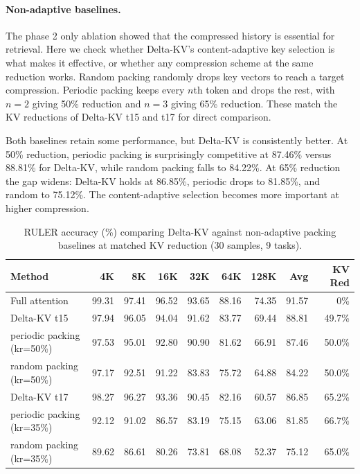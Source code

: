 \paragraph{Non-adaptive baselines.}

The phase 2 only ablation showed that the compressed history is essential for retrieval. Here we check whether Delta-KV's content-adaptive key selection is what makes it effective, or whether any compression scheme at the same reduction works. Random packing randomly drops key vectors to reach a target compression. Periodic packing keeps every $n$th token and drops the rest, with $n=2$ giving 50\% reduction and $n=3$ giving 65\% reduction. These match the KV reductions of Delta-KV t15 and t17 for direct comparison.

Both baselines retain some performance, but Delta-KV is consistently better. At 50\% reduction, periodic packing is surprisingly competitive at 87.46\% versus 88.81\% for Delta-KV, while random packing falls to 84.22\%. At 65\% reduction the gap widens: Delta-KV holds at 86.85\%, periodic drops to 81.85\%, and random to 75.12\%. The content-adaptive selection becomes more important at higher compression.

\begin{table}[!ht]
\centering
\caption{RULER accuracy (\%) comparing Delta-KV against non-adaptive packing baselines at matched KV reduction (30 samples, 9 tasks).}
\label{tab:ablation_packing}
\begin{tabular}{lrrrrrrrr}
\toprule
Method & 4K & 8K & 16K & 32K & 64K & 128K & Avg & KV Red \\
\midrule
Full attention              & 99.31 & 97.41 & 96.52 & 93.65 & 88.16 & 74.35 & 91.57 & 0\%    \\
\midrule
Delta-KV t15          & 97.94 & 96.05 & 94.04 & 91.62 & 83.77 & 69.44 & 88.81 & 49.7\% \\
periodic packing (kr=50\%)  & 97.53 & 95.01 & 92.80 & 90.90 & 81.62 & 66.91 & 87.46 & 50.0\% \\
random packing (kr=50\%)    & 97.17 & 92.51 & 91.22 & 83.83 & 75.72 & 64.88 & 84.22 & 50.0\% \\
\midrule
Delta-KV t17          & 98.27 & 96.27 & 93.36 & 90.45 & 82.16 & 60.57 & 86.85 & 65.2\% \\
periodic packing (kr=35\%)  & 92.12 & 91.02 & 86.57 & 83.19 & 75.15 & 63.06 & 81.85 & 66.7\% \\
random packing (kr=35\%)    & 89.62 & 86.61 & 80.26 & 73.81 & 68.08 & 52.37 & 75.12 & 65.0\% \\
\bottomrule
\end{tabular}
\end{table}

